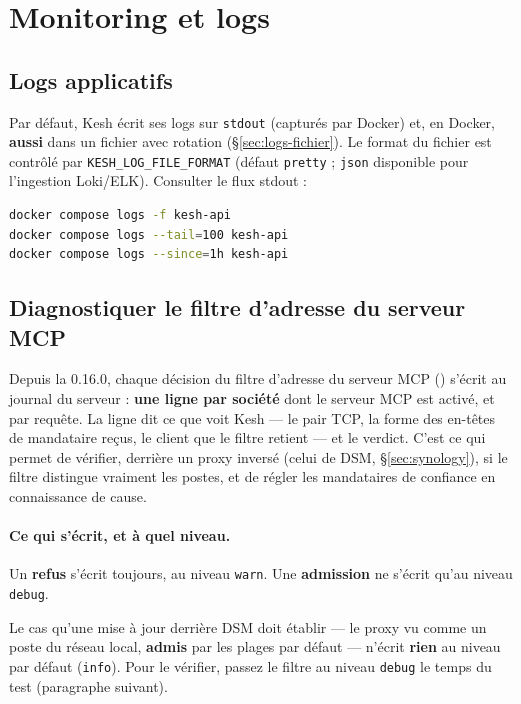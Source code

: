 \documentclass[a4paper,11pt,oneside]{article}
\begin{document}
\section{Monitoring et logs}

\subsection{Logs applicatifs}

Par défaut, Kesh écrit ses logs sur \texttt{stdout} (capturés par Docker) et, en Docker, \textbf{aussi} dans un fichier avec rotation (\S\ref{sec:logs-fichier}). Le format du fichier est contrôlé par \texttt{KESH\_LOG\_FILE\_FORMAT} (défaut \texttt{pretty} ; \texttt{json} disponible pour l'ingestion Loki/ELK). Consulter le flux stdout :

\begin{lstlisting}[language=bash]
docker compose logs -f kesh-api
docker compose logs --tail=100 kesh-api
docker compose logs --since=1h kesh-api
\end{lstlisting}

\subsection{Diagnostiquer le filtre d'adresse du serveur MCP}\label{sec:mcp-journal-filtre}

Depuis la 0.16.0, chaque décision du filtre d'adresse du serveur MCP () s'écrit au journal du serveur : \textbf{une ligne par société} dont le serveur MCP est activé, et par requête. La ligne dit ce que voit Kesh --- le pair TCP, la forme des en-têtes de mandataire reçus, le client que le filtre retient --- et le verdict. C'est ce qui permet de vérifier, derrière un proxy inversé (celui de DSM, \S\ref{sec:synology}), si le filtre distingue vraiment les postes, et de régler les mandataires de confiance en connaissance de cause.

\paragraph{Ce qui s'écrit, et à quel niveau.} Un \textbf{refus} s'écrit toujours, au niveau \texttt{warn}. Une \textbf{admission} ne s'écrit qu'au niveau \texttt{debug}.

\begin{keshwarning}
Le cas qu'une mise à jour derrière DSM doit établir --- le proxy vu comme un poste du réseau local, \textbf{admis} par les plages par défaut --- n'écrit \textbf{rien} au niveau par défaut (\texttt{info}). Pour le vérifier, passez le filtre au niveau \texttt{debug} le temps du test (paragraphe suivant).
\end{keshwarning}
\end{document}
